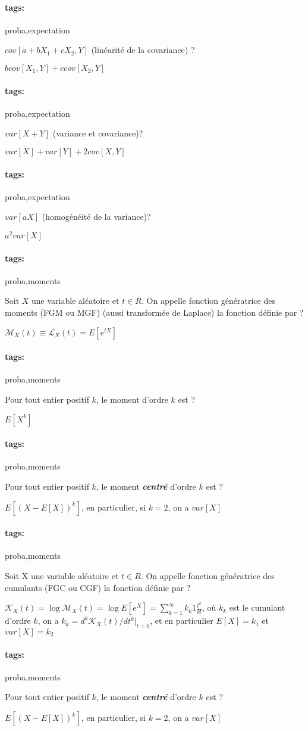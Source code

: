 \documentclass[12pt]{article}
\newcommand*{\xfield}[1]{\begin{mdframed}\centering #1\end{mdframed}\bigskip}
\newenvironment{note}{}{}
\newcommand*{\tags}[1]{\paragraph{tags: }#1}
\begin{document}
\begin{note}
	\tags{proba,expectation}
	\xfield{$cov[a + bX_1+ cX_2,Y]$ (linéarité de la covariance) ?}
	\xfield{$b cov[X_1,Y] + c cov[X_2,Y]$}
\end{note}

\begin{note}
	\tags{proba,expectation}
	\xfield{$var[X+Y]$ (variance et covariance)?}
	\xfield{$var[X] + var[Y]  + 2cov[X,Y]$}
\end{note}

\begin{note}
	\tags{proba,expectation}
	\xfield{$var[aX]$ (homogénéité de la variance)?}
	\xfield{$a^2 var[X]$}
\end{note}

\begin{note}
	\tags{proba,moments}
	\xfield{Soit $X$ une variable aléatoire et $t \in R$. On appelle
fonction génératrice des moments (FGM ou MGF) (aussi transformée de Laplace) la fonction définie
par ?}
	\xfield{$ \mathcal{M}_X (t) \equiv \mathcal{L}_X(t) = E[e^{tX}] $}
\end{note}

\begin{note}
	\tags{proba,moments}
	\xfield{Pour tout entier positif $k$, le moment d’ordre $k$ est ?}
	\xfield{$E[X^k]$}
\end{note}


\begin{note}
	\tags{proba,moments}
	\xfield{Pour tout entier positif $k$, le moment \textbf{\emph{centré}} d’ordre $k$ est ?}
	\xfield{$E[(X-E[X])^k]$, en particulier, si $k = 2$, on a $var[X]$}
\end{note}

\begin{note}
	\tags{proba,moments}
	\xfield{Soit X une variable aléatoire et $t \in R$. On
appelle fonction génératrice des cumulants (FGC ou CGF) la fonction définie par ?}
	\xfield{$\mathcal{K}_X(t) = \log{\mathcal{M}_X(t)} = \log{E[e^{X}]} = \sum \limits_{k=1}^{\infty} \mathit{k}_k1 \frac{t^k}{k!}$, où $k_k$ est le cumulant d'ordre $k$, on a
	$k_k = d^k \mathcal{K}_X(t)/dt^k |_{t = 0}$, et en particulier $E[X] = k_1$ et $var[X] = k_2$}
\end{note}

\begin{note}
	\tags{proba,moments}
	\xfield{Pour tout entier positif $k$, le moment \textbf{\emph{centré}} d’ordre $k$ est ?}
	\xfield{$E[(X-E[X])^k]$, en particulier, si $k = 2$, on a $var[X]$}
\end{note}
\end{document}
